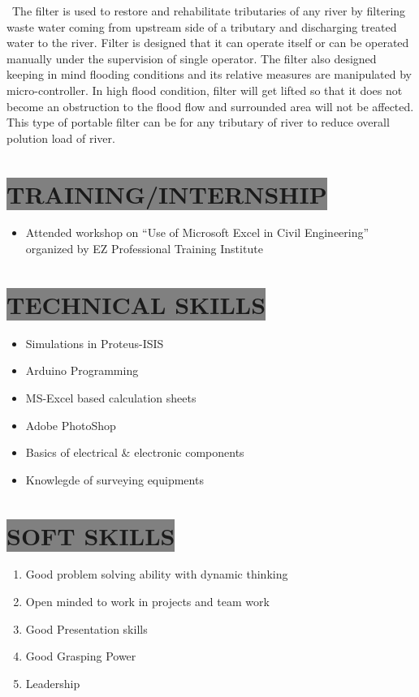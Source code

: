 \documentclass{res} %
\begin{document}
\begin{resume}
\             The filter is used to restore and rehabilitate tributaries of any river by filtering waste water coming from upstream side of a tributary and discharging treated water to the river. Filter is designed that it can operate itself or can be operated manually under the supervision of single operator. The filter also designed keeping in mind flooding conditions and its relative measures are manipulated by micro-controller. In high flood condition, filter will get lifted so that it does not become an obstruction to the flood flow and surrounded area will not be affected. This type of portable filter can be for any tributary of river to reduce overall polution load of river.  \par

\section{
\colorbox{grey}{TRAINING/INTERNSHIP}
}
\begin{itemize}
\item Attended workshop on “Use of Microsoft Excel in Civil Engineering” organized by EZ Professional Training Institute
\end{itemize}   


\section{
\colorbox{grey}{TECHNICAL SKILLS}       
}   
 \begin{itemize} 
 \item Simulations in Proteus-ISIS
 \item Arduino Programming
 \item MS-Excel based calculation sheets 
\item Adobe PhotoShop
\item Basics of electrical {\&} electronic components
\item Knowlegde of surveying equipments

 \end{itemize}

 
\section{
\colorbox{grey}{SOFT SKILLS}          
}
    \begin{enumerate} 
 \item Good problem solving ability with dynamic thinking
 \item Open minded to work in projects and team work
 \item Good Presentation skills
 \item Good Grasping Power
 \item Leadership
 \end{enumerate}



\end{resume}
\end{document}
